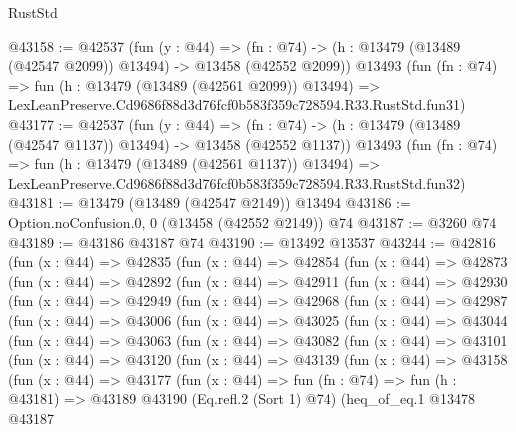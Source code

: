 \begin{lexlean}{RustStd}
\begin{coremodule}
@43158 := @42537
    (fun (y : @44) =>
    (fn : @74) -> (h : @13479 (@13489 (@42547 @2099)) @13494) -> @13458 (@42552 @2099))
    @13493
    (fun (fn : @74) =>
    fun (h : @13479 (@13489 (@42561 @2099)) @13494) =>
    LexLeanPreserve.Cd9686f88d3d76fcf0b583f359c728594.R33.RustStd.fun31)
@43177 := @42537
    (fun (y : @44) =>
    (fn : @74) -> (h : @13479 (@13489 (@42547 @1137)) @13494) -> @13458 (@42552 @1137))
    @13493
    (fun (fn : @74) =>
    fun (h : @13479 (@13489 (@42561 @1137)) @13494) =>
    LexLeanPreserve.Cd9686f88d3d76fcf0b583f359c728594.R33.RustStd.fun32)
@43181 := @13479 (@13489 (@42547 @2149)) @13494
@43186 := Option.noConfusion.{0, 0} (@13458 (@42552 @2149)) @74
@43187 := @3260 @74
@43189 := @43186 @43187 @74
@43190 := @13492 @13537
@43244 := @42816
    (fun (x : @44) =>
    @42835
      (fun (x : @44) =>
      @42854
        (fun (x : @44) =>
        @42873
          (fun (x : @44) =>
          @42892
            (fun (x : @44) =>
            @42911
              (fun (x : @44) =>
              @42930
                (fun (x : @44) =>
                @42949
                  (fun (x : @44) =>
                  @42968
                    (fun (x : @44) =>
                    @42987
                      (fun (x : @44) =>
                      @43006
                        (fun (x : @44) =>
                        @43025
                          (fun (x : @44) =>
                          @43044
                            (fun (x : @44) =>
                            @43063
                              (fun (x : @44) =>
                              @43082
                                (fun (x : @44) =>
                                @43101
                                  (fun (x : @44) =>
                                  @43120
                                    (fun (x : @44) =>
                                    @43139
                                      (fun (x : @44) =>
                                      @43158
                                        (fun (x : @44) =>
                                        @43177
                                          (fun (x : @44) =>
                                          fun (fn : @74) =>
                                          fun (h : @43181) =>
                                          @43189
                                            @43190
                                            (Eq.refl.{2} (Sort 1) @74)
                                            (heq_of_eq.{1}
                                              @13478
                                              @43187

\end{coremodule}
\end{lexlean}

